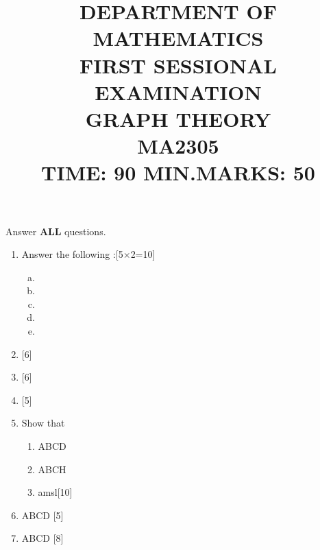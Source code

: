 \documentclass[a4paper,12pt]{article}
\title{{\Large DEPARTMENT OF MATHEMATICS}\\\small\vspace{5pt} FIRST SESSIONAL EXAMINATION \\\vspace{5pt} GRAPH THEORY \\\vspace{5pt} MA2305\\ TIME: 90 MIN.\hfill MARKS: 50}%
\author{}
\date{}
\begin{document}
\maketitle
\baselineskip=14pt
\thispagestyle{empty}\vspace{-45pt}
Answer {\bf ALL} questions. 
\begin{enumerate}
\item Answer the following :{\hfill [5$\times$2=10]}
\begin{enumerate}[(a)]
   \item 
 \item 
  \item 
  \item 
  \item 
\end{enumerate}
\item {\hfill [6]}
\item {\hfill [6]}
\item {\hfill [5]}
\item Show that
\begin{enumerate}
 \item ABCD
 \item ABCH
 \item amsl{\hfill [10]}
\end{enumerate}
\item ABCD {\hfill [5]}
\item ABCD {\hfill [8]}
\end{enumerate}
\end{document}
